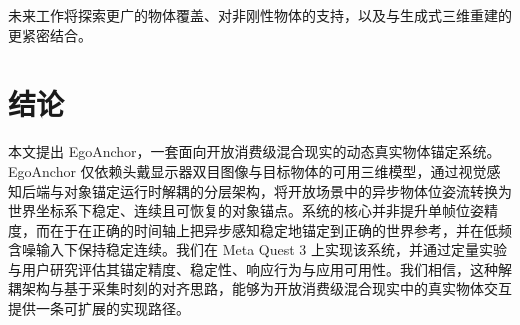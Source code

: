 \documentclass[review]{vgtc}
\begin{document}
未来工作将探索更广的物体覆盖、对非刚性物体的支持，以及与生成式三维重建的更紧密结合。

\section{结论}\label{sec:conclusion}


本文提出 EgoAnchor，一套面向开放消费级混合现实的动态真实物体锚定系统。EgoAnchor 仅依赖头戴显示器双目图像与目标物体的可用三维模型，通过视觉感知后端与对象锚定运行时解耦的分层架构，将开放场景中的异步物体位姿流转换为世界坐标系下稳定、连续且可恢复的对象锚点。系统的核心并非提升单帧位姿精度，而在于在正确的时间轴上把异步感知稳定地锚定到正确的世界参考，并在低频含噪输入下保持稳定连续。我们在 Meta Quest 3 上实现该系统，并通过定量实验与用户研究评估其锚定精度、稳定性、响应行为与应用可用性。我们相信，这种解耦架构与基于采集时刻的对齐思路，能够为开放消费级混合现实中的真实物体交互提供一条可扩展的实现路径。
\end{document}
